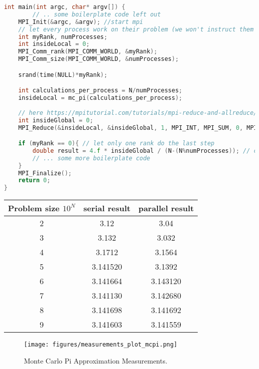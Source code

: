 \documentclass[UTF-8]{article}
\begin{document}
\begin{itemize}
\begin{lstlisting}[language=c]
int main(int argc, char* argv[]) {
        // .. some boilerplate code left out
	MPI_Init(&argc, &argv); //start mpi
	// let every process work on their problem (we won't instruct them from the root node 0 only gather the data)
	int myRank, numProcesses;
	int insideLocal = 0;
	MPI_Comm_rank(MPI_COMM_WORLD, &myRank);
	MPI_Comm_size(MPI_COMM_WORLD, &numProcesses);

	srand(time(NULL)*myRank);

	int calculations_per_process = N/numProcesses;
	insideLocal = mc_pi(calculations_per_process);
	
	// here https://mpitutorial.com/tutorials/mpi-reduce-and-allreduce/ was quite helpful
	int insideGlobal = 0;
	MPI_Reduce(&insideLocal, &insideGlobal, 1, MPI_INT, MPI_SUM, 0, MPI_COMM_WORLD);

	if (myRank == 0){ // let only one rank do the last step
		double result = 4.f * insideGlobal / (N-(N%numProcesses)); // correction if N is not fully divisible by numProcesses
		// ... some more boilerplate code
	}
	MPI_Finalize();
	return 0;
}
\end{lstlisting}

     
     \begin{table}[H]
    \centering
        \begin{tabular}{|c|c|c|}
        \hline
        Problem size $10^N$ & serial result & parallel result \\ \hline 
        2 & 3.12          & 3.04            \\ \hline 
        3 & 3.132         & 3.032           \\ \hline 
        4 & 3.1712        & 3.1564          \\ \hline 
        5 & 3.141520      & 3.1392          \\ \hline 
        6 & 3.141664      & 3.143120        \\ \hline 
        7 & 3.141130      & 3.142680        \\ \hline 
        8 & 3.141698      & 3.141692        \\ \hline 
        9 & 3.141603      & 3.141559        \\\hline
        \end{tabular}
    \end{table}
    	
    	
            \begin{figure}
                \centering
                \texttt{[image: figures/measurements\_plot\_mcpi.png]}
                \caption{Monte Carlo Pi Approximation Measurements.}
                \label{fig:measurement_mcpi}
            \end{figure}
\begin{table}[]
\centering
    \begin{tabular}{|c|c|c|}
            

\end{tabular}
\end{table}
\end{itemize}
\end{document}
